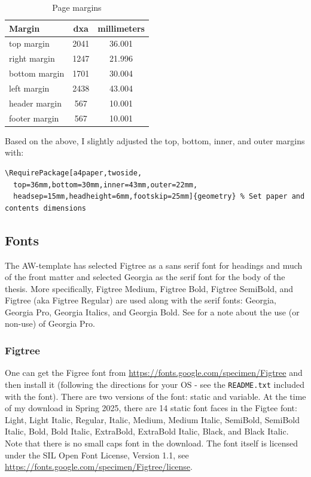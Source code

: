 \documentclass[12pt, twoside]{article}
\begin{document}
\begin{table}[!ht]
  \begin{center}
    \caption{Page margins}
    \label{tab:cycle3pageMargins}
    \begin{tabular}{l| S[table-format=6.0] | S[table-format=4.4]} %
      \textbf{Margin} & \textbf{dxa} & \textbf{millimeters} \\
      \hline
top margin &    2041  &	36.001 \\
right margin&  1247 &	21.996 \\
bottom margin& 1701 &	30.004 \\
left margin&   2438 &	43.004 \\
header margin&  567 &	10.001 \\
footer margin&  567 &	10.001 \\
    \end{tabular}
  \end{center}
\end{table}
\FloatBarrier

Based on the above, I slightly adjusted the top, bottom, inner, and outer margins with:
\begin{lstlisting}[style=latexExampleForAuthors]
\RequirePackage[a4paper,twoside,
  top=36mm,bottom=30mm,inner=43mm,outer=22mm,
  headsep=15mm,headheight=6mm,footskip=25mm]{geometry} % Set paper and contents dimensions
\end{lstlisting}
\clearpage

\subsection{Fonts}
\label{sec:cycle3Fonts}

The AW-template has selected Figtree as a sans serif font for headings and much of the front matter and selected Georgia as the serif font for the body of the thesis. More specifically,  Figtree Medium, Figtree Bold, Figtree SemiBold, and Figtree (aka Figtree Regular) are used along with the serif fonts: Georgia, Georgia Pro, Georgia Italics, and Georgia Bold. See  for a note about the use (or non-use) of Georgia Pro.

\subsubsection{Figtree}

One can get the Figree font from \url{https://fonts.google.com/specimen/Figtree} and then install it (following the directions for your \gls{OS} - see the \texttt{README.txt} included with the font). There are two versions of the font: \first static and \Second variable. At the time of my download in Spring 2025, there are 14 static font faces in the Figtee font: Light, Light Italic, Regular, Italic, Medium, Medium Italic, SemiBold, SemiBold Italic, Bold, Bold Italic, ExtraBold, ExtraBold Italic, Black, and Black Italic. Note that there is no small caps font in the download. The font itself is licensed under the SIL Open Font License, Version 1.1, see \url{https://fonts.google.com/specimen/Figtree/license}.
\end{document}
